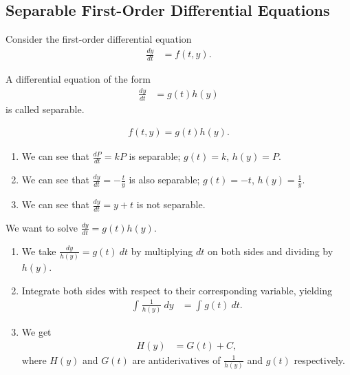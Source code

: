 \documentclass[10pt]{mypackage}
\begin{document}
\subsection{Separable First-Order Differential Equations}%
Consider the first-order differential equation
\begin{align*}
  \frac{dy}{dt} &= f(t,y).
\end{align*}
\begin{definition}
  A differential equation of the form
  \begin{align*}
    \frac{dy}{dt} &= g(t)h(y)
  \end{align*}
  is called separable.
\end{definition}
\begin{note}
\begin{align*}
  f(t,y) = g(t)h(y).
\end{align*}
\end{note}
\begin{example}\hfill
  \begin{enumerate}[(1)]
    \item We can see that $\frac{dP}{dt} = kP$ is separable; $g(t) = k$, $h(y) = P$.
    \item We can see that $\frac{dy}{dt} = -\frac{t}{y}$ is also separable; $g(t) = -t$, $h(y) = \frac{1}{y}$.
    \item We can see that $\frac{dy}{dt} = y + t$ is not separable.
  \end{enumerate}
\end{example}
\begin{method}
  We want to solve $\frac{dy}{dt} = g(t)h(y)$.
  \begin{enumerate}[(1)]
    \item We take $\frac{dy}{h(y)} = g(t)\:dt$ by multiplying $dt$ on both sides and dividing by $h(y)$.
    \item Integrate both sides with respect to their corresponding variable, yielding
      \begin{align*}
        \int_{}^{} \frac{1}{h(y)}\:dy &= \int_{}^{} g(t)\:dt.
      \end{align*}
    \item We get
      \begin{align*}
        H(y) &= G(t) + C,
      \end{align*}
      where $H(y)$ and $G(t)$ are antiderivatives of $\frac{1}{h(y)}$ and $g(t)$ respectively.
  \end{enumerate}
\end{method}
\end{document}
